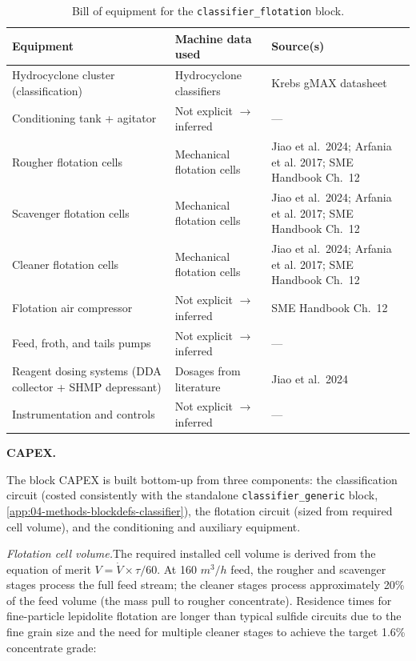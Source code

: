 \begin{table}[h!]
\caption{Bill of equipment for the \texttt{classifier\_flotation} block.}
\centering
\begin{tabular}{>{\raggedright\arraybackslash}p{5.2cm}
				>{\raggedright\arraybackslash}p{4cm}
				>{\raggedright\arraybackslash}p{4.5cm}}
\toprule
\textbf{Equipment} & \textbf{Machine data used} & \textbf{Source(s)} \\
\midrule
Hydrocyclone cluster (classification) & Hydrocyclone classifiers & Krebs gMAX datasheet \\
Conditioning tank + agitator & Not explicit $\rightarrow$ inferred & --- \\
Rougher flotation cells & Mechanical flotation cells & Jiao et al.\ 2024; Arfania et al. 2017; SME Handbook Ch.\ 12 \\
Scavenger flotation cells & Mechanical flotation cells & Jiao et al.\ 2024; Arfania et al. 2017; SME Handbook Ch.\ 12 \\
Cleaner flotation cells & Mechanical flotation cells & Jiao et al.\ 2024; Arfania et al. 2017; SME Handbook Ch.\ 12 \\
Flotation air compressor & Not explicit $\rightarrow$ inferred & SME Handbook Ch.\ 12 \\
Feed, froth, and tails pumps & Not explicit $\rightarrow$ inferred & --- \\
Reagent dosing systems (DDA collector + SHMP depressant) & Dosages from literature & Jiao et al.\ 2024 \\
Instrumentation and controls & Not explicit $\rightarrow$ inferred & --- \\
\bottomrule
\end{tabular}
\end{table}


\medskip
\noindent\textbf{CAPEX.}\quad
 
The block CAPEX is built bottom-up from three components: the classification circuit (costed consistently with the standalone \texttt{classifier\_generic} block, \ref{app:04-methods-blockdefs-classifier}), the flotation circuit (sized from required cell volume), and the conditioning and auxiliary equipment.
 
\medskip
\noindent\textit{Flotation cell volume.}\quad The required installed cell volume is derived from the equation of merit $V = \dot{V} \times \tau / 60$. At 160 $\si{m^3/h}$ feed, the rougher and scavenger stages process the full feed stream; the cleaner stages process approximately 20\% of the feed volume (the mass pull to rougher concentrate). Residence times for fine-particle lepidolite flotation are longer than typical sulfide circuits due to the fine grain size and the need for multiple cleaner stages to achieve the target 1.6\%  concentrate grade:
 
